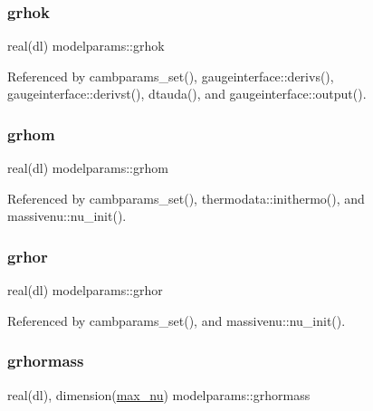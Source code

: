 \mbox{\label{namespacemodelparams_a01ee7412b553c0b2ab7ea2fcc5ee0a24}} 
\subsubsection{\texorpdfstring{grhok}{grhok}}
{\footnotesize\ttfamily real(dl) modelparams\+::grhok}



Referenced by cambparams\+\_\+set(), gaugeinterface\+::derivs(), gaugeinterface\+::derivst(), dtauda(), and gaugeinterface\+::output().

\mbox{\label{namespacemodelparams_a2ef8c57ec3ca12626295c0af7c8891b9}} 
\subsubsection{\texorpdfstring{grhom}{grhom}}
{\footnotesize\ttfamily real(dl) modelparams\+::grhom}



Referenced by cambparams\+\_\+set(), thermodata\+::inithermo(), and massivenu\+::nu\+\_\+init().

\mbox{\label{namespacemodelparams_aad31721fc53cb058072f19818ffd7178}} 
\subsubsection{\texorpdfstring{grhor}{grhor}}
{\footnotesize\ttfamily real(dl) modelparams\+::grhor}



Referenced by cambparams\+\_\+set(), and massivenu\+::nu\+\_\+init().

\mbox{\label{namespacemodelparams_aea40a307408a18a8b9e794a71c409f18}} 
\subsubsection{\texorpdfstring{grhormass}{grhormass}}
{\footnotesize\ttfamily real(dl), dimension(\mbox{\hyperlink{namespacemodelparams_a5e3667fcd2aae0fb15654c207fc6830e}{max\+\_\+nu}}) modelparams\+::grhormass}



